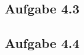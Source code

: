 \documentclass{standalone}
\begin{document}
 

\subsection{Aufgabe 4.3}

\subsection{Aufgabe 4.4}
\end{document}
